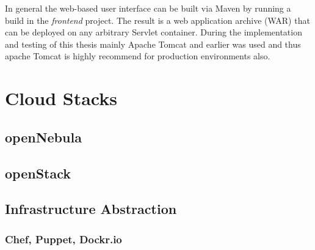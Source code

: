 In general the web-based user interface can be built via Maven by running a build in the \emph{frontend} project. The result is a web application archive (WAR) that can be deployed on any arbitrary Servlet \versionServlet{} container. During the implementation and testing of this thesis mainly Apache Tomcat \versionTomcat{} and earlier was used and thus apache Tomcat is highly recommend for production environments also.



\section{Cloud Stacks}

\subsection{openNebula}

\subsection{openStack}
\label{appendix:openstack}

\subsection{Infrastructure Abstraction}
\label{appendix:provisioning}

\subsubsection{Chef, Puppet, Dockr.io}


